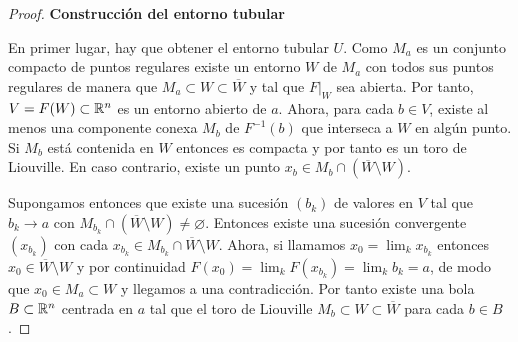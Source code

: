 \begin{proof}\leavevmode

 \noindent \textbf{Construcción del entorno tubular}

  En primer lugar, hay que obtener el entorno tubular $U$. Como $M_a$ es un conjunto compacto de puntos regulares existe un entorno $W$ de $M_a$ con todos sus puntos regulares de manera que $M_a\subset W \subset \overline{W}$ y tal que $F|_W$ sea abierta. Por tanto, $V=F(W)\subset \mathbb{R}^n$ es un entorno abierto de $a$. Ahora, para cada $b\in V$, existe al menos una componente conexa $M_b$ de $F^{-1}(b)$ que interseca a $W$ en algún punto. Si $M_b$ está contenida en $W$ entonces es compacta y por tanto es un toro de Liouville. En caso contrario, existe un punto $x_b\in M_{b}\cap (\overline{W}\setminus W)$.
  
  Supongamos entonces que existe una sucesión $(b_k)$ de valores en $V$ tal que $b_k\rightarrow a$ con $M_{b_k}\cap(\overline{W}\setminus W) \neq \varnothing$. Entonces existe una sucesión convergente $(x_{b_k})$ con cada $x_{b_k}\in M_{b_k}\cap \overline{W}\setminus W$. Ahora, si llamamos $x_0=\lim_k x_{b_k}$ entonces $x_0\in \overline{W}\setminus W$ y por continuidad $F(x_0)=\lim_k F(x_{b_k})=\lim_k b_k =a$, de modo que $x_0 \in M_a\subset W$ y llegamos a una contradicción. Por tanto existe una bola $B\subset \mathbb{R}^n$ centrada en $a$ tal que el toro de Liouville $M_b\subset W \subset \overline{W}$ para cada $b\in B$. 
  

\end{proof}
